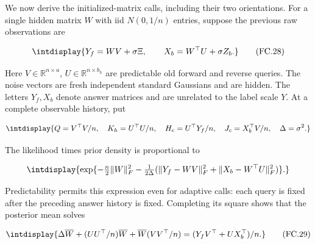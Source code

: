 
We now derive the initialized-matrix calls, including their two orientations. For a single hidden matrix \(W\) with iid \(N(0,\allowbreak 1/n)\) entries, suppose the previous raw observations are


\begingroup\renewcommand{\theHequation}{intdisplay.727}
\begin{equation}
\intdisplay{
Y_f=WV+\sigma\Xi,\qquad X_b=W^\top U+\sigma Z_b.
}
\tag{FC.28}
\label{int:eq-0333-fc-28}
\end{equation}
\endgroup


Here \(V\in\mathbb R^{n\times a}\), \(U\in\mathbb R^{n\times b_h}\) are predictable old forward and reverse queries. The noise vectors are fresh independent standard Gaussians and are hidden. The letters \(Y_f,\allowbreak X_b\) denote answer matrices and are unrelated to the label scale \(Y\). At a complete observable history, put


\begingroup\renewcommand{\theHequation}{intdisplay.728}
\begin{equation*}
\intdisplay{
Q=V^\top V/n,\quad K_h=U^\top U/n,\quad
H_c=U^\top Y_f/n,\quad J_c=X_b^\top V/n,\quad \Delta=\sigma^2.
}
\end{equation*}
\endgroup


The likelihood times prior density is proportional to


\begingroup\renewcommand{\theHequation}{intdisplay.729}
\begin{equation*}
\intdisplay{
\exp\{-\tfrac n2\|W\|_F^2
-\tfrac1{2\Delta}(\|Y_f-WV\|_F^2+\|X_b-W^\top U\|_F^2)\}.
}
\end{equation*}
\endgroup


Predictability permits this expression even for adaptive calls: each query is fixed after the preceding answer history is fixed. Completing its square shows that the posterior mean solves


\begingroup\renewcommand{\theHequation}{intdisplay.730}
\begin{equation}
\intdisplay{
\Delta\overline W+(UU^\top/n)\overline W
+\overline W(VV^\top/n)=(Y_fV^\top+UX_b^\top)/n.
}
\tag{FC.29}
\label{int:eq-0334-fc-29}
\end{equation}
\endgroup

